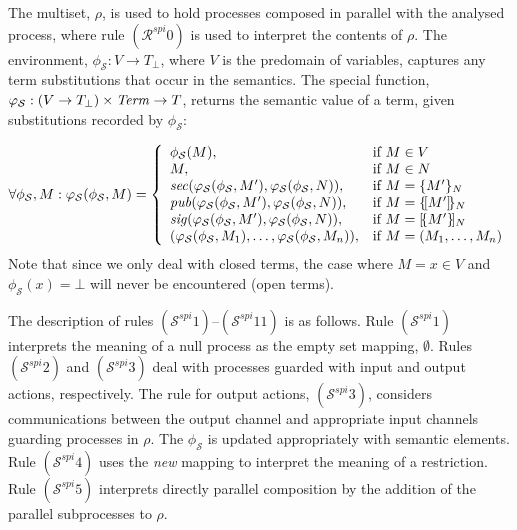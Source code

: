 \documentclass[10pt,a4paper,final,oneside,fleqn]{book}
\begin{document}
The multiset, $\rho$, is used to hold processes composed in parallel with the analysed process, where rule $(\mathcal{R}^{spi}0)$ is used to interpret the contents of $\rho$.  The environment, $\phi_\mathcal{S}:V\to T_\bot$, where $V$ is the predomain of variables, captures any term substitutions that occur in the semantics. The special function, $\varphi_\mathcal{S}:(V\to T_\bot)\times\mbox{{\itshape Term\/}}\to T$, returns the semantic value of a term, given substitutions recorded by $\phi_\mathcal{S}$:\vspace{5mm}

\noindent
\[\forall\phi_\mathcal{S},M:\varphi_\mathcal{S}(\phi_\mathcal{S},M)=\left\{\begin{array}{ll}\phi_\mathcal{S}(M),&\mbox{if }M\in V\\
M,&\mbox{if }M\in N\\
\mbox{{\itshape sec\/}}(\varphi_\mathcal{S}(\phi_\mathcal{S},M'),\varphi_\mathcal{S}(\phi_\mathcal{S},N)),&\mbox{if }M=\{M'\}_{N}\\
\mbox{{\itshape pub\/}}(\varphi_\mathcal{S}(\phi_\mathcal{S},M'),\varphi_\mathcal{S}(\phi_\mathcal{S},N)),&\mbox{if }M=\{\![M']\!\}_{N}\\
\mbox{{\itshape sig\/}}(\varphi_\mathcal{S}(\phi_\mathcal{S},M'),\varphi_\mathcal{S}(\phi_\mathcal{S},N)),&\mbox{if }M=[\!\{M'\}\!]_{N}\\
(\varphi_\mathcal{S}(\phi_\mathcal{S},M_1),\ldots,\varphi_\mathcal{S}(\phi_\mathcal{S},M_n)),&\mbox{if }M=(M_1,\ldots,M_n)\\

\end{array}\right.\]
Note that since we only deal with closed terms, the case where $M=x\in V$ and $\phi_\mathcal{S}(x)=\bot$ will never be encountered (open terms).

The description of rules $(\mathcal{S}^{spi}1)$--$(\mathcal{S}^{spi}11)$ is as follows.  Rule $(\mathcal{S}^{spi}1)$ interprets the meaning of a null process as the empty set mapping, $\emptyset$.  Rules $(\mathcal{S}^{spi}2)$ and $(\mathcal{S}^{spi}3)$ deal with processes guarded with input and output actions, respectively.  The rule for output actions, $(\mathcal{S}^{spi}3)$, considers communications between the output channel and appropriate input channels guarding processes in $\rho$.  The $\phi_\mathcal{S}$ is updated appropriately with semantic elements. Rule $(\mathcal{S}^{spi}4)$ uses the {\itshape new\/} mapping to interpret the meaning of a restriction. Rule $(\mathcal{S}^{spi}5)$ interprets directly parallel composition by the addition of the parallel subprocesses to $\rho$.
\end{document}
